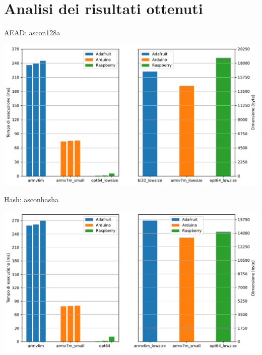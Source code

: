 \section{Analisi dei risultati ottenuti}


\begin{frame}{AEAD: ascon128a}

    \begin{center}
        \includegraphics[height=0.40\textwidth]{images/aead.pdf}
    \end{center}
    
\end{frame}


\begin{frame}{Hash: asconhasha}

    \begin{center}
        \includegraphics[height=0.40\textwidth]{images/hash.pdf}
    \end{center}
    
\end{frame}


